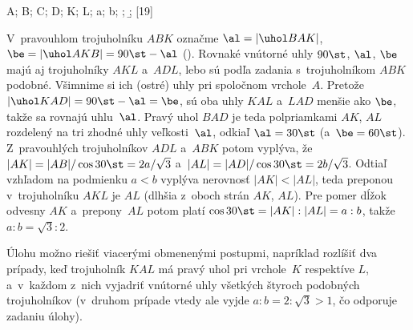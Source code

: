 {%
\fontplace
\tpoint A; \tpoint B; \bpoint C; \bpoint D;
\lpoint K; \bpoint L; \tpoint a; \rpoint b;
\cpoint\a; \cpoint\b;
[19] \hfil\Obr

V~pravouhlom trojuholníku $ABK$ označme
$\al=|\uhol BAK|$, $\be=|\uhol AKB|=90\st-\al$ (\obr).
\inspicture{}
Rovnaké vnútorné uhly $90\st$, $\al$, $\be$ majú aj trojuholníky $AKL$
a~$ADL$, lebo sú podľa zadania s~trojuholníkom $ABK$ podobné. Všimnime si
ich (ostré) uhly pri spoločnom vrchole~$A$. Pretože $|\uhol
KAD|=90\st-\al=\be$, sú oba uhly $KAL$ a~$LAD$ menšie ako $\be$,
takže sa rovnajú uhlu~$\al$. Pravý uhol $BAD$ je teda
polpriamkami $AK$, $AL$ rozdelený na tri zhodné uhly veľkosti~$\al$,
odkiaľ $\al=30\st$ (a~$\be=60\st$). Z~pravouhlých trojuholníkov
$ADL$ a~$ABK$ potom vyplýva, že $|AK|=|AB|/\cos30\st=2a/\sqrt3$
a~$|AL|=|AD|/\cos30\st=2b/\sqrt3$. Odtiaľ vzhľadom na podmienku
$a<b$ vyplýva nerovnosť $|AK|<|AL|$, teda preponou v~trojuholníku $AKL$
je $AL$ (dlhšia z~oboch strán $AK$, $AL$). Pre pomer dĺžok odvesny
$AK$ a~prepony~$AL$ potom platí $\cos30\st=|AK|:|AL|=a:b$, takže
$a:b=\sqrt{3}:2$.

\smallskip
Úlohu možno riešiť viacerými obmenenými postupmi, napríklad rozlíšiť dva
prípady, keď trojuholník $KAL$ má pravý uhol pri vrchole~$K$ respektíve
$L$, a~v~každom z~nich vyjadriť vnútorné uhly všetkých štyroch podobných
trojuholníkov (v~druhom prípade vtedy ale vyjde $a:b=2:\sqrt3>1$, čo
odporuje zadaniu úlohy).}

